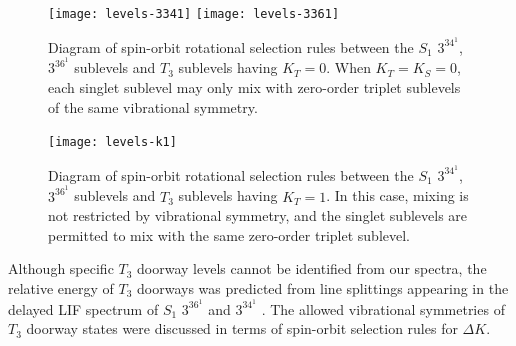 \documentclass[12pt]{mitthesis}
\begin{document}


\begin{figure}
  \caption{Diagram of spin-orbit rotational selection rules between
    the $S_1$ $3^34^1$, $3^36^1$  sublevels and $T_3$ sublevels
    having $K_T=0$.  When $K_T=K_S=0$, each singlet sublevel may only
    mix with zero-order triplet sublevels of the same vibrational
    symmetry.}
  \label{fig:levels-k0}
  \centering
  \vspace{5mm}
  \texttt{[image: levels-3341]}
  \texttt{[image: levels-3361]}  
\end{figure}

\begin{figure}
  \caption{Diagram of spin-orbit rotational selection rules between
    the $S_1$ $3^34^1$, $3^36^1$  sublevels and $T_3$ sublevels
    having $K_T=1$.  In this case, mixing is not restricted by
    vibrational symmetry, and the singlet sublevels are permitted to
    mix with the same zero-order triplet sublevel.}
  \label{fig:levels-k1}
  \centering
  \vspace{5mm}
  \texttt{[image: levels-k1]}
\end{figure}


Although specific $T_3$ doorway levels cannot be identified from our
spectra, the relative energy of $T_3$ doorways was predicted from line
splittings appearing in the delayed LIF spectrum of $S_1$ $3^36^1$
 and $3^34^1$ .  The allowed vibrational symmetries of
$T_3$ doorway states were discussed in terms of spin-orbit selection
rules for $\Delta K$.  






















\end{document}
